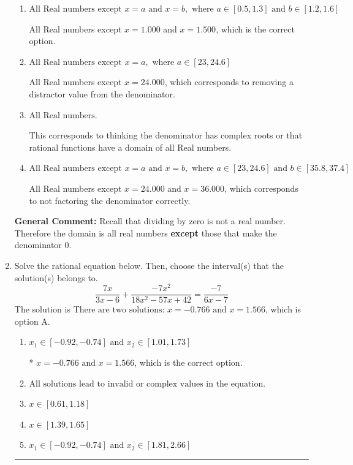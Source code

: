 \documentclass{extbook}[14pt]
\newcommand{\litem}[1]{\item #1

\rule{\textwidth}{0.4pt}}
\begin{document}
\begin{enumerate}
{\begin{enumerate}[label=\Alph*.]
All Real numbers except $x = 1.000$, which corresponds to removing only 1 value from the denominator.
\item \( \text{All Real numbers except } x = a \text{ and } x = b, \text{ where } a \in [0.5, 1.3] \text{ and } b \in [1.2, 1.6] \)

All Real numbers except $x = 1.000$ and $x = 1.500$, which is the correct option.
\item \( \text{All Real numbers except } x = a, \text{ where } a \in [23, 24.6] \)

All Real numbers except $x = 24.000$, which corresponds to removing a distractor value from the denominator.
\item \( \text{All Real numbers.} \)

This corresponds to thinking the denominator has complex roots or that rational functions have a domain of all Real numbers.
\item \( \text{All Real numbers except } x = a \text{ and } x = b, \text{ where } a \in [23, 24.6] \text{ and } b \in [35.8, 37.4] \)

All Real numbers except $x = 24.000$ and $x = 36.000$, which corresponds to not factoring the denominator correctly.
\end{enumerate}

\textbf{General Comment:} Recall that dividing by zero is not a real number. Therefore the domain is all real numbers \textbf{except} those that make the denominator 0.
}
\litem{
Solve the rational equation below. Then, choose the interval(s) that the solution(s) belongs to.
\[ \frac{7x}{3x -6} + \frac{-7x^{2}}{18x^{2} -57 x + 42} = \frac{-7}{6x -7} \]The solution is \( \text{There are two solutions: } x = -0.766 \text{ and } x = 1.566 \), which is option A.\begin{enumerate}[label=\Alph*.]
\item \( x_1 \in [-0.92, -0.74] \text{ and } x_2 \in [1.01,1.73] \)

* $x = -0.766 \text{ and } x = 1.566$, which is the correct option.
\item \( \text{All solutions lead to invalid or complex values in the equation.} \)


\item \( x \in [0.61,1.18] \)


\item \( x \in [1.39,1.65] \)


\item \( x_1 \in [-0.92, -0.74] \text{ and } x_2 \in [1.81,2.66] \)



\end{enumerate}}
\end{enumerate}
\end{document}

